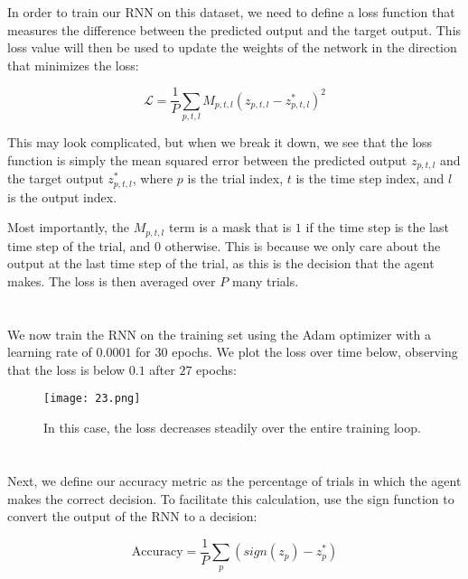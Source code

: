 \documentclass{article}
\begin{document}
In order to train our RNN on this dataset, we need to define a loss function that measures the difference between the predicted output and the target output. This loss value will then be used to update the weights of the network in the direction that minimizes the loss:

\begin{equation}
    \mathcal{L}=\frac{1}{P} \sum_{p, t, l} M_{p, t, l}\left(z_{p, t, l}- z^*_{p, t, l}\right)^{2}
\end{equation}
\vspace{.1em}

This may look complicated, but when we break it down, we see that the loss function is simply the mean squared error between the predicted output $z_{p, t, l}$ and the target output $z^*_{p, t, l}$, where $p$ is the trial index, $t$ is the time step index, and $l$ is the output index.
\vspace{1em}

Most importantly, the $M_{p, t, l}$ term is a mask that is $1$ if the time step is the last time step of the trial, and $0$ otherwise. This is because we only care about the output at the last time step of the trial, as this is the decision that the agent makes. The loss is then averaged over $P$ many trials.
\newpage


\section{}

We now train the RNN on the training set using the Adam optimizer with a learning rate of $0.0001$ for $30$ epochs. We plot the loss over time below, observing that the loss is below $0.1$ after $27$ epochs:

\begin{figure}[ht]
    \centering
    \texttt{[image: 23.png]}
    \caption{In this case, the loss decreases steadily over the entire training loop.}
\end{figure}


\section{}

Next, we define our accuracy metric as the percentage of trials in which the agent makes the correct decision. To facilitate this calculation, use the sign function to convert the output of the RNN to a decision: 

\begin{equation}
    \text{Accuracy} = \frac{1}{P} \sum_{p} \left(sign(z_{p})- z^*_{p}\right)
\end{equation}
\vspace{.1em}
\end{document}
